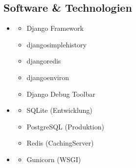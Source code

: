 \documentclass[a4paper,12pt,ngerman]{sphinxmanual}
\begin{document}
\subsection{Software \& Technologien}
\label{\detokenize{sections/implementierung:software-technologien}}\begin{itemize}
\item {} \begin{description}
\begin{itemize}
\item {} 
\sphinxAtStartPar
Django Framework

\item {} 
\sphinxAtStartPar
django\sphinxhyphen{}simple\sphinxhyphen{}history

\item {} 
\sphinxAtStartPar
django\sphinxhyphen{}redis

\item {} 
\sphinxAtStartPar
django\sphinxhyphen{}environ

\item {} 
\sphinxAtStartPar
Django Debug Toolbar

\end{itemize}

\end{description}

\item {} \begin{description}
\begin{itemize}
\item {} 
\sphinxAtStartPar
SQLite (Entwicklung)

\item {} 
\sphinxAtStartPar
PostgreSQL (Produktion)

\item {} 
\sphinxAtStartPar
Redis (Caching\sphinxhyphen{}Server)

\end{itemize}

\end{description}

\item {} \begin{description}
\begin{itemize}
\item {} 
\sphinxAtStartPar
Gunicorn (WSGI)


\end{itemize}
\end{description}
\end{itemize}
\end{document}
